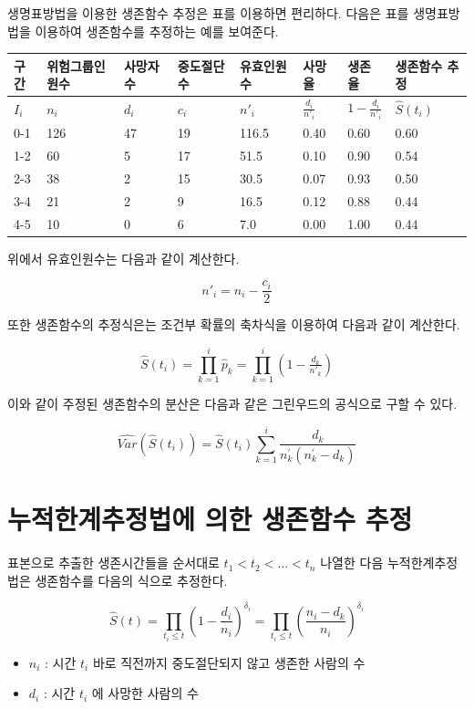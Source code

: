 \documentclass[
]{book}
\providecommand{\tightlist}{%
  \setlength{\itemsep}{0pt}\setlength{\parskip}{0pt}}
\theoremstyle{definition}
\theoremstyle{definition}
\theoremstyle{definition}
\theoremstyle{definition}
\theoremstyle{remark}
\begin{document}
생명표방법을 이용한 생존함수 추정은 표를 이용하면 편리하다. 다음은 표를 생명표방법을 이용하여 생존함수를 추정하는 예를 보여준다.

\begin{longtable}[]{@{}llllllll@{}}
\toprule
구간 & 위험그룹인원수 & 사망자 수 & 중도절단 수 & 유효인원수 & 사망율 & 생존율 & 생존함수 추정\tabularnewline
\midrule
\endhead
\(I_i\) & \(n_i\) & \(d_i\) & \(c_i\) & \(n'_i\) & \(\tfrac{d_i}{n'_i}\) & \(1-\tfrac{d_i}{n'_i}\) & \(\hat S(t_i)\)\tabularnewline
0-1 & 126 & 47 & 19 & 116.5 & 0.40 & 0.60 & 0.60\tabularnewline
1-2 & 60 & 5 & 17 & 51.5 & 0.10 & 0.90 & 0.54\tabularnewline
2-3 & 38 & 2 & 15 & 30.5 & 0.07 & 0.93 & 0.50\tabularnewline
3-4 & 21 & 2 & 9 & 16.5 & 0.12 & 0.88 & 0.44\tabularnewline
4-5 & 10 & 0 & 6 & 7.0 & 0.00 & 1.00 & 0.44\tabularnewline
\bottomrule
\end{longtable}

위에서 유효인원수는 다음과 같이 계산한다.

\[ n'_i = n_i - \frac{c_i}{2} \]

또한 생존함수의 추정식은는 조건부 확률의 축차식을 이용하여 다음과 같이 계산한다.

\[ \hat S(t_i) = \prod_{k=1}^i \hat p_k = \prod_{k=1}^i  \left ( 1-\tfrac{d_k}{n'_k} \right ) \]

이와 같이 주정된 생존함수의 분산은 다음과 같은 그린우드의 공식으로 구할 수 있다.

\[ \widehat {Var} (\hat S (t_i) ) =  \hat S(t_i)  \sum_{k=1}^i \frac{d_k}{ n_k^{'} ( n_k^{'} -d_k)} \]

\hypertarget{uxb204uxc801uxd55cuxacc4uxcd94uxc815uxbc95uxc5d0-uxc758uxd55c-uxc0dduxc874uxd568uxc218-uxcd94uxc815}{%
\section{누적한계추정법에 의한 생존함수 추정}\label{uxb204uxc801uxd55cuxacc4uxcd94uxc815uxbc95uxc5d0-uxc758uxd55c-uxc0dduxc874uxd568uxc218-uxcd94uxc815}}

표본으로 추출한 생존시간들을 순서대로 \(t_1 < t_2 < \dots < t_n\) 나열한 다음 누적한계추정법은 생존함수를 다음의 식으로 추정한다.

\[ \hat S(t) =  \prod_{t_i \le t}  \left ( 1-\frac{d_i}{n_i} \right)^{\delta_i}
=  \prod_{t_i \le t}  \left ( \frac{n_i-d_k}{n_i} \right)^{\delta_i}\]

\begin{itemize}
\tightlist
\item
  \(n_i\) : 시간 \(t_i\) 바로 직전까지 중도절단되지 않고 생존한 사람의 수
\item
  \(d_i\) : 시간 \(t_i\) 에 사망한 사람의 수
\end{itemize}
\end{document}
